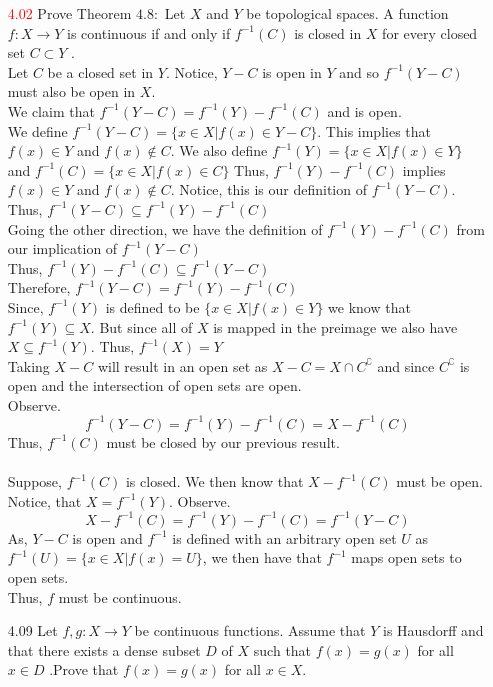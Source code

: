 \documentclass[12pt]{article}
\begin{document}
\begin{enumerate}
\begin{enumerate}
	\end{enumerate}
	\item[\textcolor{red}{4.02}] Prove Theorem $4.8 :$ Let $X$ and $Y$ be topological spaces. A function $f : X \rightarrow Y$ is continuous if and only if $f ^ { - 1 } ( C )$ is closed in $X$ for every closed set $C \subset Y$ .\\
	Let $ C $ be a closed set in $ Y $. Notice, $ Y - C$ is open in $ Y $ and so $ f^{-1}(Y-C) $ must also be open in $ X $. \\
	We claim that $ f^{-1}(Y-C)=f^{-1}(Y)-f^{-1}(C) $ and is open.\\
	We define $ f^{-1}(Y-C) = \{x\in X| f(x)\in Y-C \} $. This implies that $ f(x)\in Y $ and $ f(x)\not \in C $. We also define $ f^{-1}(Y)=\{x\in X|f(x)\in Y \} $ and $ f^{-1}(C)=\{x\in X| f(x)\in C\} $ Thus, $ f^{-1}(Y)-f^{-1}(C) $ implies $ f(x)\in Y $ and $ f(x)\not\in C $. Notice, this is our definition of $f^{-1}(Y-C)$.\\
	Thus, $ f^{-1}(Y-C) \subseteq f^{-1}(Y)-f^{-1}(C)  $\\
	Going the other direction, we have the definition of $f^{-1}(Y)-f^{-1}(C) $ from our implication of $ f^{-1}(Y-C) $\\
	Thus, $ f^{-1}(Y)-f^{-1}(C) \subseteq f^{-1}(Y-C) $\\
	Therefore,  $ f^{-1}(Y-C)=f^{-1}(Y)-f^{-1}(C) $ \\
	Since, $ f^{-1}(Y) $ is defined to be $ \{x\in X| f(x)\in Y\} $ we know that $ f^{-1}(Y)\subseteq X $. But since all of $ X $ is mapped in the preimage we also have $ X\subseteq f^{-1}(Y) $. Thus, $ f^{-1}(X)=Y $\\
	Taking $ X-C $ will result in an open set as $ X-C=X\cap C^\complement $ and since $ C^\complement $ is open and the intersection of open sets are open.\\
	Observe.
		\[f^{-1}(Y-C)=f^{-1}(Y)-f^{-1}(C)=X-f^{-1}(C)\]
	Thus, $ f^{-1}(C) $ must be closed by our previous result.\\
	\\
	Suppose, $ f^{-1}(C) $ is closed. We then know that $X-f^{-1}(C)$ must be open. Notice, that $ X=f^{-1}(Y) $. Observe. 
		\[X-f^{-1}(C) = f^{-1}(Y)-f^{-1}(C) = f^{-1}(Y-C) \]
	As, $ Y - C $ is open and $ f^{-1}$ is defined with an arbitrary open set $ U $ as $ f^{-1}(U)=\{x\in X| f(x)=U\} $, we then have that $ f^{-1} $ maps open sets to open sets.\\
	Thus, $ f $ must be continuous.
	\item[4.09] Let $f , g : X \rightarrow Y$ be continuous functions. Assume that $Y$ is Hausdorff and that there exists a dense subset $D$ of $X$ such that $f ( x ) = g ( x )$ for all $x \in D$ .Prove that $f ( x ) = g ( x )$ for all $x \in X .$\\
	

\end{enumerate}
\end{document}

